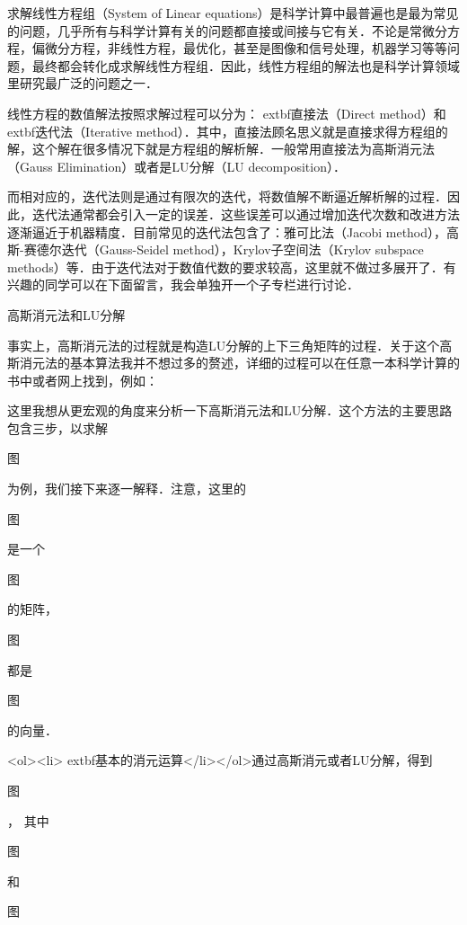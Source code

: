 
\begin{issues}
\issueDraft
\end{issues}

求解线性方程组（System of Linear equations）是科学计算中最普遍也是最为常见的问题，几乎所有与科学计算有关的问题都直接或间接与它有关．不论是常微分方程，偏微分方程，非线性方程，最优化，甚至是图像和信号处理，机器学习等等问题，最终都会转化成求解线性方程组．因此，线性方程组的解法也是科学计算领域里研究最广泛的问题之一．

线性方程的数值解法按照求解过程可以分为：	extbf{直接法}（Direct method）和	extbf{迭代法}（Iterative method）．其中，直接法顾名思义就是直接求得方程组的解，这个解在很多情况下就是方程组的解析解．一般常用直接法为高斯消元法（Gauss Elimination）或者是LU分解（LU decomposition）．

而相对应的，迭代法则是通过有限次的迭代，将数值解不断逼近解析解的过程．因此，迭代法通常都会引入一定的误差．这些误差可以通过增加迭代次数和改进方法逐渐逼近于机器精度．目前常见的迭代法包含了：雅可比法（Jacobi method），高斯-赛德尔迭代（Gauss-Seidel method），Krylov子空间法（Krylov subspace methods）等．由于迭代法对于数值代数的要求较高，这里就不做过多展开了．有兴趣的同学可以在下面留言，我会单独开一个子专栏进行讨论．

高斯消元法和LU分解

事实上，高斯消元法的过程就是构造LU分解的上下三角矩阵的过程．关于这个高斯消元法的基本算法我并不想过多的赘述，详细的过程可以在任意一本科学计算的书中或者网上找到，例如：



这里我想从更宏观的角度来分析一下高斯消元法和LU分解．这个方法的主要思路包含三步，以求解

图

 为例，我们接下来逐一解释．注意，这里的

图

  是一个

图

 的矩阵，

图

 都是

图

 的向量．

<ol><li>	extbf{基本的消元运算}</li></ol>通过高斯消元或者LU分解，得到

图

 ， 其中

图

 和

图


